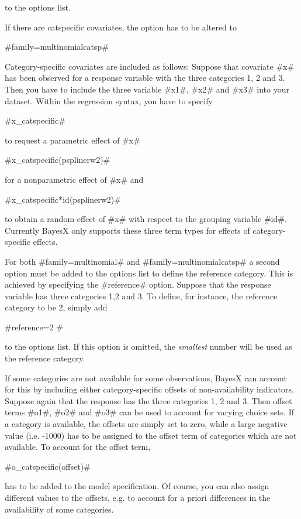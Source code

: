 to the options list.

If there are catspecific covariates, the option has to be altered to

#family=multinomialcatsp#

Category-specific covariates are included as follows: Suppose that
covariate #x# has been observed for a response variable with the
three categories 1, 2 and 3. Then you have to include the three
variable #x1#, #x2# and #x3# into your dataset. Within the
regression syntax, you have to specify

#x_catspecific#

to request a parametric effect of #x#

#x_catspecific(psplinerw2)#

for a nonparametric effect of #x# and

#x_catspecific*id(psplinerw2)#

to obtain a random effect of #x# with respect to the grouping
variable #id#. Currently BayesX only supports these three term types
for effects of category-specific effects.

For both #family=multinomial# and #family=multinomialcatsp# a second
option must be added to the options list to define the reference
category. This is achieved by specifying the #reference# option.
Suppose that the response variable has three categories 1,2 and 3.
To define, for instance, the reference category to be 2, simply add

#reference=2 #

to the options list. If this option is omitted, the {\em smallest}
number will be used as the reference category.

If some categories are not available for some observations, BayesX
can account for this by including either category-specific offsets
of non-availability indicators. Suppose again that the response has
the three categories 1, 2 and 3. Then offset terms #o1#, #o2# and
#o3# can be used to account for varying choice sets. If a category
is available, the offsets are simply set to zero, while a large
negative value (i.e. -1000) has to be assigned to the offset term of
categories which are not available. To account for the offset term,

#o_catspecific(offset)#

has to be added to the model specification. Of course, you can also
assign different values to the offsets, e.g. to account for a priori
differences in the availability of some categories.

